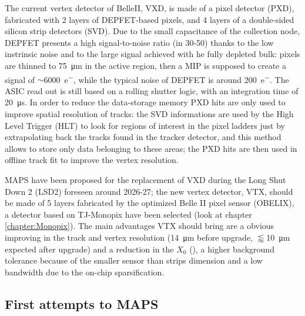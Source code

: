         The current vertex detector of BelleII, VXD, is made of a pixel detector (PXD), fabricated with 2 layers of DEPFET-based pixels, and 4 layers of a double-sided silicon strip detectors (SVD)\cite{BelleII-DEPFET}.
        Due to the small capacitance of the collection node, DEPFET presents a high signal-to-noise ratio (in 30-50) thanks to the low instrinsic noise and to the large signal achieved with he fully depleted bulk: pixels are thinned to \SI{75}{\um} in the active region, then a MIP is supposed to create a signal of $\sim$\SI{6000}{e^-}, while the typical noise of DEPFET is around \SI{200}{e^-}.
        The ASIC read out is still based on a rolling shutter logic, with an integration time of \SI{20}{\us}.
        In order to reduce the data-storage memory PXD hits are only used to improve spatial resolution of tracks: the SVD informations are used by the High Level Trigger (HLT) to look for regions of interest in the pixel ladders just by extrapolating back the tracks found in the tracker detector, and this method allows to store only data belonging to these areas; the PXD hits are then used in offline track fit to improve the vertex resolution.
        
        MAPS have been proposed for the replacement of VXD during the  Long Shut Down 2 (LSD2) foreseen around 2026-27; the new vertex detector, VTX, should be made of 5 layers fabricated by the optimized Belle II pixel sensor (OBELIX), a detector based on TJ-Monopix have been selected (look at chapter \ref{chapter:Monopix}).    
        The main advantages VTX should bring are a obvious improving in the track and vertex resolution (\SI{14}{\um} before upgrade, $\lessapprox$\SI{10}{\um} expected after upgrade) and a reduction in the $X_0$ (), a higher background tolerance because of the smaller sensor than strips dimension and a low bandwidth due to the on-chip sparsification. 

    \subsection{First attempts to MAPS}
